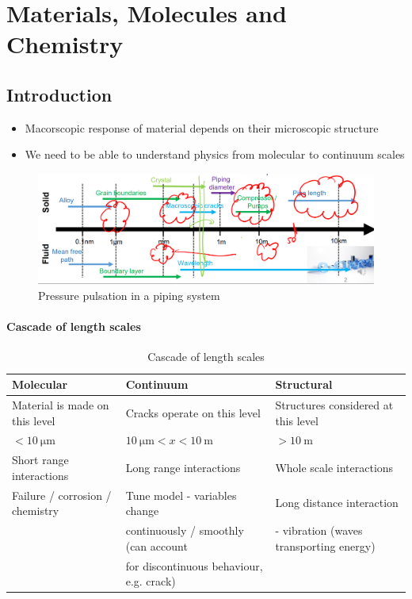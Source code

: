 \chapter{Materials, Molecules and Chemistry}
\section{Introduction}
\begin{itemize}
	\item Macorscopic response of material depends on their microscopic structure
	\item We need to be able to understand physics from molecular to continuum scales
\end{itemize}
\begin{figure}[H]
	\centering
	\includegraphics[width = \textwidth]{./img/figure1.png}
	\caption{Pressure pulsation in a piping system}
\end{figure}
\subsubsection{Cascade of length scales}
\begin{table}
\begin{adjustbox}{width=\columnwidth,center}
	\begin{tabular}{@{}lll@{}}
		\toprule
		\textbf{Molecular} & \textbf{Continuum} & \textbf{Structural}\\
		\midrule
		Material is made on this level & Cracks operate on this level & Structures considered at this level\\
		$< \SI{10}{\micro\meter}$ & $\SI{10}{\micro\meter} < x < \SI{10}{\meter}$ & $> \SI{10}{\meter}$\\
		Short range interactions & Long range interactions & Whole scale interactions\\
		Failure / corrosion / chemistry & Tune model - variables change & Long distance interaction \\
		& continuously / smoothly (can account & - vibration (waves transporting energy)\\
		& for discontinuous behaviour, e.g. crack) & \\
		\bottomrule
	\end{tabular}
\end{adjustbox}
\caption{Cascade of length scales}
\end{table}
